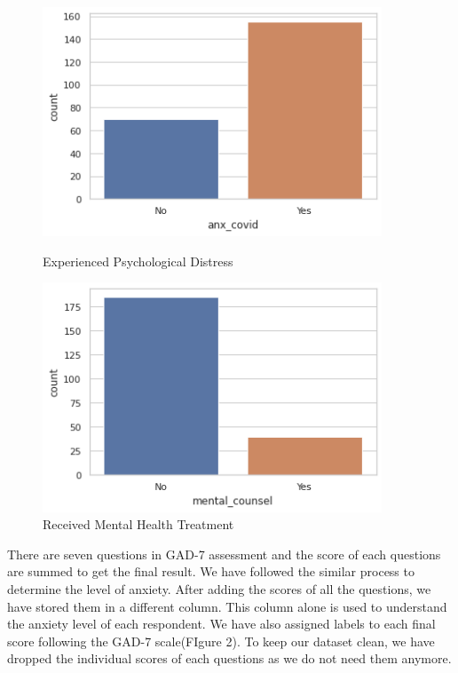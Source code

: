 \documentclass[12pt, english]{article}
\begin{document}
\begin{figure}[H]
    \centering
    \begin{minipage}{0.45\textwidth}
        \centering
        \includegraphics[width=0.9\textwidth]{images/anx_covid.png} %
        \caption{Experienced Psychological Distress}
    \end{minipage}\hfill
    \begin{minipage}{0.45\textwidth}
        \centering
        \includegraphics[width=0.9\textwidth]{images/mental_counsel.png} %
        \caption{Received Mental Health Treatment}
    \end{minipage}
\end{figure}

There are seven questions in GAD-7 assessment and the score of each questions are summed to get the final result. We have followed the similar process to determine the level of anxiety. After adding the scores of all the questions, we have stored them in a different column. This column alone is used to understand the anxiety level of each respondent. We have also assigned labels to each final score following the GAD-7 scale(FIgure 2). To keep our dataset clean, we have dropped the individual scores of each questions as we do not need them anymore. 
\end{document}
